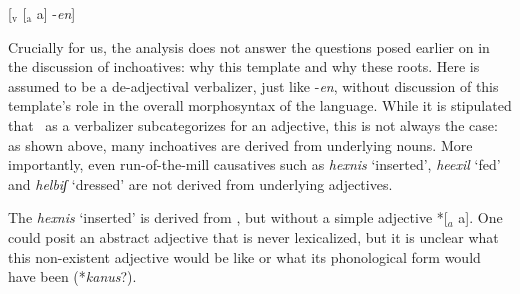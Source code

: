 \begin{exe}
\begin{xlist}
\begin{xlist}
\begin{exe}
\begin{exe}
\begin{xlist}
\begin{exe}
\begin{xlist}
\begin{exe}
\begin{xlist}
\begin{xlist}
\begin{exe}
\begin{xlist}
\begin{exe}
\begin{xlist}
\begin{exe}
\begin{xlist}
\begin{exe}
\begin{exe}
\begin{exe}
\begin{xlist}
\begin{exe}
\begin{exe}
\begin{xlist}
\begin{xlist}
\begin{exe}
\begin{xlist}
\begin{exe}
\begin{exe}
\begin{xlist}
\begin{exe}
\begin{exe}
\begin{xlist}
\begin{exe}
\begin{xlist}
\begin{exe}
\begin{xlist}
\begin{exe}
\begin{xlist}
\begin{exe}
\begin{exe}
\begin{xlist}
\begin{exe}
\begin{exe}
\begin{xlist}
\begin{xlist}
\begin{exe}
\begin{xlist}
\begin{xlist}
\begin{exe}
\begin{xlist}
\begin{exe}
\begin{xlist}
\begin{exe}
\begin{xlist}
\begin{exe}
\begin{xlist}
\begin{exe}
\begin{exe}
\begin{exe}
\begin{exe}
\begin{xlist}
\begin{exe}
\begin{exe}
\begin{xlist}
\begin{xlist}
\begin{exe}
\begin{exe}
\begin{xlist}
\begin{exe}
\begin{xlist}
\begin{exe}
\begin{xlist}
\begin{exe}
\begin{xlist}
\begin{exe}
\begin{xlist}
\begin{exe}
\begin{exe}
\label{ex:vd:thif-borer-inch}{[}$_{\text{v}}$ [$_{\text{a}}$  a] -\emph{en}] 
 \z 

Crucially for us, the analysis does not answer the questions posed earlier on in the discussion of inchoatives: why this template and why these roots. Here {\thif} is assumed to be a de-adjectival verbalizer, just like -\emph{en}, without discussion of this template's role in the overall morphosyntax of the language. While it is stipulated that \thif~as a verbalizer subcategorizes for an adjective, this is not always the case: as shown above, many inchoatives are derived from underlying nouns. More importantly, even run-of-the-mill causatives such as \emph{hexnis} `inserted', \emph{heexil} `fed' and \emph{helbiʃ} `dressed' are not derived from underlying adjectives.

The  \emph{hexnis} `inserted' is derived from , but without a simple adjective *[$_{a}$  a]. One could posit an abstract adjective that is never lexicalized, but it is unclear what this non-existent adjective would be like or what its phonological form would have been (*\emph{kanus}?).
 \begin{exe}
\end{exe}
\end{exe}
\end{exe}
\end{xlist}
\end{exe}
\end{xlist}
\end{exe}
\end{xlist}
\end{exe}
\end{xlist}
\end{exe}
\end{xlist}
\end{exe}
\end{exe}
\end{xlist}
\end{xlist}
\end{exe}
\end{exe}
\end{xlist}
\end{exe}
\end{exe}
\end{exe}
\end{exe}
\end{xlist}
\end{exe}
\end{xlist}
\end{exe}
\end{xlist}
\end{exe}
\end{xlist}
\end{exe}
\end{xlist}
\end{xlist}
\end{exe}
\end{xlist}
\end{xlist}
\end{exe}
\end{exe}
\end{xlist}
\end{exe}
\end{exe}
\end{xlist}
\end{exe}
\end{xlist}
\end{exe}
\end{xlist}
\end{exe}
\end{xlist}
\end{exe}
\end{exe}
\end{xlist}
\end{exe}
\end{exe}
\end{xlist}
\end{exe}
\end{xlist}
\end{xlist}
\end{exe}
\end{exe}
\end{xlist}
\end{exe}
\end{exe}
\end{exe}
\end{xlist}
\end{exe}
\end{xlist}
\end{exe}
\end{xlist}
\end{exe}
\end{xlist}
\end{xlist}
\end{exe}
\end{xlist}
\end{exe}
\end{xlist}
\end{exe}
\end{exe}
\end{xlist}
\end{xlist}
\end{exe}
